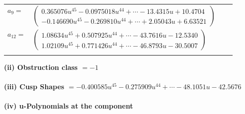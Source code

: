 \documentclass[1p]{elsarticle_modified}
\theoremstyle{definition}
\begin{document}
\begin{tabular}{m{7pt} m{180pt} m{7pt} m{180pt} }
\flushright $a_{9}=$&$\begin{pmatrix}0.365076 u^{45}-0.0975018 u^{44}+\cdots-13.4315 u+10.4704\\-0.146690 u^{45}-0.269810 u^{44}+\cdots+2.05043 u+6.63521\end{pmatrix}$ \\
\flushright $a_{12}=$&$\begin{pmatrix}1.08634 u^{45}+0.507925 u^{44}+\cdots-43.7616 u-12.5340\\1.02109 u^{45}+0.771426 u^{44}+\cdots-46.8793 u-30.5007\end{pmatrix}$\\&\end{tabular}
\flushleft \textbf{(ii) Obstruction class $= -1$}\\~\\
\flushleft \textbf{(iii) Cusp Shapes $= -0.400585 u^{45}-0.275909 u^{44}+\cdots-48.1051 u-42.5676$}\\~\\
\newpage\renewcommand{\arraystretch}{1}
\flushleft \textbf{(iv) u-Polynomials at the component}\newline \\
\end{document}
